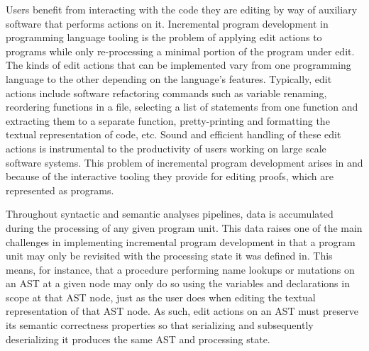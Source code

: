 Users benefit from interacting with the code they are editing by way of auxiliary software that performs actions on it.
Incremental program development in programming language tooling is the problem of applying edit actions to programs while only re-processing a minimal portion of the program under edit.
The kinds of edit actions that can be implemented vary from one programming language to the other depending on the language's features.
Typically, edit actions include software refactoring commands such as variable renaming, reordering functions in a file, selecting a list of statements from one function and extracting them to a separate function, pretty-printing and formatting the textual representation of code, etc.
Sound and efficient handling of these edit actions is instrumental to the productivity of users working on large scale software systems.
This problem of incremental program development arises in \Beluga and \Harpoon because of the interactive tooling they provide for editing proofs, which are represented as programs.

Throughout syntactic and semantic analyses pipelines, data is accumulated during the processing of any given program unit.
This data raises one of the main challenges in implementing incremental program development in that a program unit may only be revisited with the processing state it was defined in.
This means, for instance, that a procedure performing name lookups or mutations on an \ac{AST} at a given node may only do so using the variables and declarations in scope at that \ac{AST} node, just as the user does when editing the textual representation of that \ac{AST} node.
As such, edit actions on an \ac{AST} must preserve its semantic correctness properties so that serializing and subsequently deserializing it produces the same \ac{AST} and processing state.

